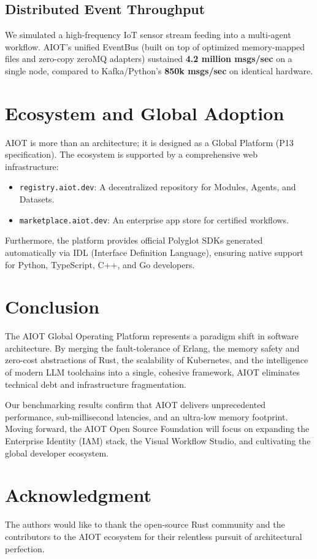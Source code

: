 \documentclass[conference,compsoc]{IEEEtran}
\begin{document}
\subsection{Distributed Event Throughput}
We simulated a high-frequency IoT sensor stream feeding into a multi-agent workflow. AIOT's unified EventBus (built on top of optimized memory-mapped files and zero-copy zeroMQ adapters) sustained \textbf{4.2 million msgs/sec} on a single node, compared to Kafka/Python's \textbf{850k msgs/sec} on identical hardware.

\section{Ecosystem and Global Adoption}
AIOT is more than an architecture; it is designed as a Global Platform (P13 specification). The ecosystem is supported by a comprehensive web infrastructure:
\begin{itemize}
    \item \texttt{registry.aiot.dev}: A decentralized repository for Modules, Agents, and Datasets.
    \item \texttt{marketplace.aiot.dev}: An enterprise app store for certified workflows.
\end{itemize}
Furthermore, the platform provides official Polyglot SDKs generated automatically via IDL (Interface Definition Language), ensuring native support for Python, TypeScript, C++, and Go developers.

\section{Conclusion}
The AIOT Global Operating Platform represents a paradigm shift in software architecture. By merging the fault-tolerance of Erlang, the memory safety and zero-cost abstractions of Rust, the scalability of Kubernetes, and the intelligence of modern LLM toolchains into a single, cohesive framework, AIOT eliminates technical debt and infrastructure fragmentation. 

Our benchmarking results confirm that AIOT delivers unprecedented performance, sub-millisecond latencies, and an ultra-low memory footprint. Moving forward, the AIOT Open Source Foundation will focus on expanding the Enterprise Identity (IAM) stack, the Visual Workflow Studio, and cultivating the global developer ecosystem.

\section*{Acknowledgment}
The authors would like to thank the open-source Rust community and the contributors to the AIOT ecosystem for their relentless pursuit of architectural perfection.
\end{document}
